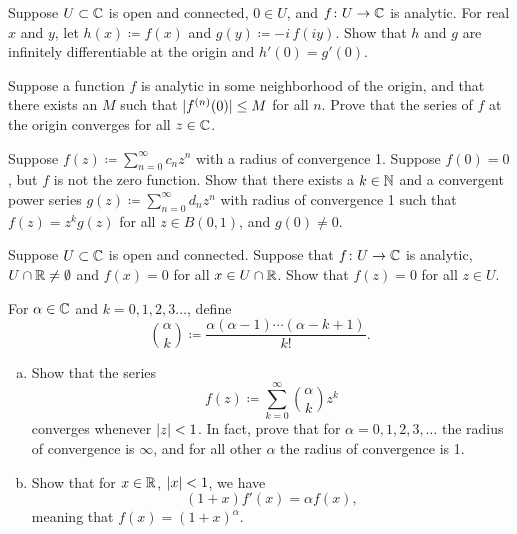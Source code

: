\begin{exercise}
Suppose $U \subset {\mathbb{C}}$ is open and connected, $0 \in U$, and $f \colon U
\to {\mathbb{C}}$ is analytic.  For real $x$ and $y$,
let $h(x) \coloneqq f(x)$ and $g(y) \coloneqq -i \, f(iy)$.
Show that $h$ and $g$ are infinitely differentiable at the origin and
$h'(0) = g'(0)$.
\end{exercise}

\begin{exercise}
Suppose a function $f$ is analytic in some neighborhood of the origin,
and that there exists an $M$
such that $\lvert {f^{(n)}(0)} \rvert \leq M$ for all $n$.
Prove that the series of $f$ at the origin converges for all $z \in {\mathbb{C}}$.
\end{exercise}

\begin{exercise}
Suppose $f(z) \coloneqq \sum_{n=0}^\infty c_n z^n$ with a radius of convergence 1.  Suppose $f(0)
= 0$, but $f$ is not the zero function.
Show that there exists a $k \in {\mathbb{N}}$ and a convergent
power series $g(z) \coloneqq \sum_{n=0}^\infty d_n z^n$ with radius of convergence 1
such that $f(z) = z^k g(z)$ for all $z \in B(0,1)$, and $g(0) \neq 0$.
\end{exercise}

\begin{exercise}
Suppose $U \subset {\mathbb{C}}$ is open and connected.  Suppose that
$f \colon U \to {\mathbb{C}}$ is analytic, $U \cap {\mathbb{R}} \neq \emptyset$ and
$f(x) = 0$ for all $x \in U \cap {\mathbb{R}}$.  Show that $f(z) = 0$ for all $z \in
U$.
\end{exercise}

\begin{exercise}
For $\alpha \in {\mathbb{C}}$ and $k=0,1,2,3\ldots$, define
\begin{equation*}
\binom{\alpha}{k} \coloneqq \frac{\alpha(\alpha-1)\cdots(\alpha-k+1)}{k!} .
\end{equation*}
\begin{enumerate}[a)]
\item
Show that the series
\begin{equation*}
f(z) \coloneqq \sum_{k=0}^\infty \binom{\alpha}{k} z^k
\end{equation*}
converges whenever $\lvert {z} \rvert < 1$.
In fact, prove that for $\alpha = 0,1,2,3,\ldots$ the radius of
convergence is $\infty$, and for all other $\alpha$
the radius of convergence is 1.
\item
Show that for $x \in {\mathbb{R}}$, $\lvert {x} \rvert < 1$, we have
\begin{equation*}
(1+x) f'(x) = \alpha f(x) ,
\end{equation*}
meaning that $f(x) = (1+x)^\alpha$.
\end{enumerate}
\end{exercise}

